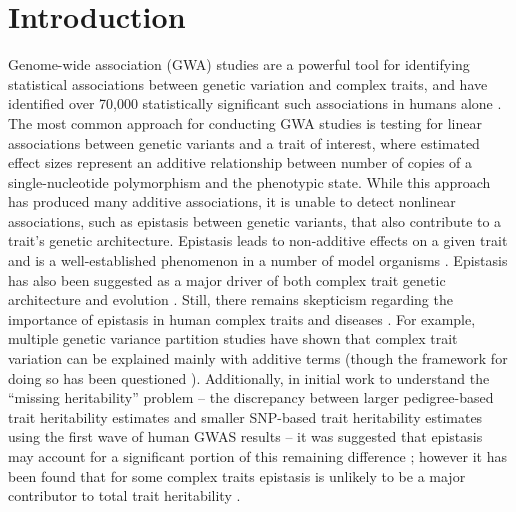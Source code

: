\documentclass[12pt,a4paper]{article}
\begin{document}
\linenumbers

\section{Introduction}\label{InterPath-Introduction}

Genome-wide association (GWA) studies are a powerful tool for identifying statistical associations between genetic variation and complex traits, and have identified over 70,000 statistically significant such associations in humans alone \citep{Buniello2019}. The most common approach for conducting GWA studies is testing for linear associations between genetic variants and a trait of interest, where estimated effect sizes represent an additive relationship between number of copies of a single-nucleotide polymorphism and the phenotypic state. While this approach has produced many additive associations, it is unable to detect nonlinear associations, such as epistasis between genetic variants, that also contribute to a trait's genetic architecture. Epistasis leads to non-additive effects on a given trait and is a well-established phenomenon in a number of model organisms \citep{Lehner2006,Rowe2008,Shao2008,Flint2009,Costanzo2010,He2010,Jarvis2011,Pettersson2011,Bloom2013,Monnahan2015}. Epistasis has also been suggested as a major driver of both complex trait genetic architecture and evolution \citep{Carlborg2004,Carlborg2006,Martin2007,Phillips2008,Moore2009,Zuk2012,Jones2014,Mackay2014}. Still, there remains skepticism regarding the importance of epistasis in human complex traits and diseases \citep{Hill2008,Crow2010,Yang2010,Aschard2012,Powell2013,Maki-Tanila2014,Wood2014,Yang2015}. For example, multiple genetic variance partition studies have shown that complex trait variation can be explained mainly with additive terms \citep{Hill2008,Crow2010,Maki-Tanila2014} (though the framework for doing so has been questioned \citep{Huang2016}). Additionally, in initial work to understand the  ``missing heritability'' problem -- the discrepancy between larger pedigree-based trait heritability estimates and smaller SNP-based trait heritability estimates using the first wave of human GWAS results \citep{Maher2008,Manolio2009,Eichler2010} -- it was suggested that epistasis may account for a significant portion of this remaining difference \citep{Slatkin2009,Zuk2012,Hemani2013}; however it has been found that for some complex traits epistasis is unlikely to be a major contributor to total trait heritability \citep{Yang2015}.
\end{document}
